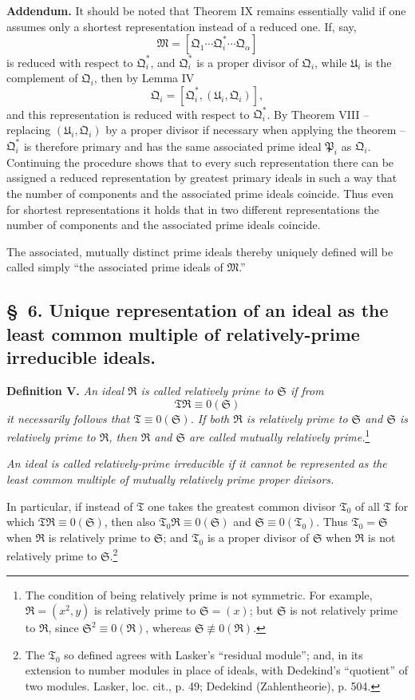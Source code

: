 \documentclass[11pt]{article}
\newcommand{\ideal}[1]{\mathfrak{#1}}
\begin{document}
\textbf{Addendum.} It should be noted that Theorem IX remains essentially valid if one assumes only a shortest representation instead of a reduced one. If, say,
\[
 \ideal M=[\ideal Q_1\cdots\ideal Q_i^*\cdots\ideal Q_\alpha]
\]
is reduced with respect to $\ideal Q_i^*$, and $\ideal Q_i^*$ is a proper divisor of $\ideal Q_i$, while $\ideal U_i$ is the complement of $\ideal Q_i$, then by Lemma IV
\[
 \ideal Q_i=[\ideal Q_i^*,(\ideal U_i,\ideal Q_i)],
\]
and this representation is reduced with respect to $\ideal Q_i^*$. By Theorem VIII -- replacing $(\ideal U_i,\ideal Q_i)$ by a proper divisor if necessary when applying the theorem -- $\ideal Q_i^*$ is therefore primary and has the same associated prime ideal $\ideal P_i$ as $\ideal Q_i$. Continuing the procedure shows that to every such representation there can be assigned a reduced representation by greatest primary ideals in such a way that the number of components and the associated prime ideals coincide. Thus even for shortest representations it holds that in two different representations the number of components and the associated prime ideals coincide.

The associated, mutually distinct prime ideals thereby uniquely defined will be called simply ``the associated prime ideals of $\ideal M$.''




\subsection*{\S~6. Unique representation of an ideal as the least common multiple of relatively-prime irreducible ideals.}

\textbf{Definition V.} \emph{An ideal $\ideal R$ is called relatively prime to $\ideal S$ if from
\[
 \ideal T\ideal R\equiv0(\ideal S)
\]
it necessarily follows that $\ideal T\equiv0(\ideal S)$. If both $\ideal R$ is relatively prime to $\ideal S$ and $\ideal S$ is relatively prime to $\ideal R$, then $\ideal R$ and $\ideal S$ are called mutually relatively prime.}\footnote{The condition of being relatively prime is not symmetric. For example, $\ideal R=(x^2,y)$ is relatively prime to $\ideal S=(x)$; but $\ideal S$ is not relatively prime to $\ideal R$, since $\ideal S^2\equiv0(\ideal R)$, whereas $\ideal S\not\equiv0(\ideal R)$.}

\emph{An ideal is called relatively-prime irreducible if it cannot be represented as the least common multiple of mutually relatively prime proper divisors.}

In particular, if instead of $\ideal T$ one takes the greatest common divisor $\ideal T_0$ of all $\ideal T$ for which $\ideal T\ideal R\equiv0(\ideal S)$, then also $\ideal T_0\ideal R\equiv0(\ideal S)$ and $\ideal S\equiv0(\ideal T_0)$. Thus $\ideal T_0=\ideal S$ when $\ideal R$ is relatively prime to $\ideal S$; and $\ideal T_0$ is a proper divisor of $\ideal S$ when $\ideal R$ is not relatively prime to $\ideal S$.\footnote{The $\ideal T_0$ so defined agrees with Lasker's ``residual module''; and, in its extension to number modules in place of ideals, with Dedekind's ``quotient'' of two modules. Lasker, loc. cit., p. 49; Dedekind (Zahlentheorie), p. 504.}
\end{document}
